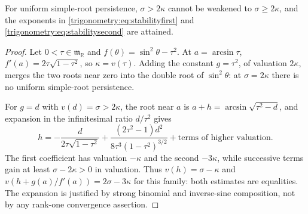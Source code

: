 \documentclass[11pt,letterpaper]{article}
\numberwithin{equation}{section}
\theoremstyle{definition}
\theoremstyle{remark}
\newcommand{\R}{\mathbb R}
\newcommand{\mm}{\mathfrak m}
\begin{document}
\begin{proposition}\label{trigonometry:prop:sharp}
For uniform simple-root persistence, $\sigma>2\kappa$ cannot be weakened to $\sigma\ge2\kappa$, and
the exponents in \cref{trigonometry:eq:stabilityfirst} and
\cref{trigonometry:eq:stabilitysecond} are attained.
\end{proposition}
\begin{proof}
Let $0<\tau\in\mm_{\R}$ and $f(\theta)=\sin^2\theta-\tau^2$. At $a=\arcsin\tau$,
$f'(a)=2\tau\sqrt{1-\tau^2}$, so $\kappa=v(\tau)$. Adding the constant $g=\tau^2$, of valuation
$2\kappa$, merges the two roots near zero into the double root of $\sin^2\theta$: at
$\sigma=2\kappa$ there is no uniform simple-root persistence.

For $g=d$ with $v(d)=\sigma>2\kappa$, the root near $a$ is $a+h=\arcsin\sqrt{\tau^2-d}$, and
expansion in the infinitesimal ratio $d/\tau^2$ gives
\[
 h=-\frac d{2\tau\sqrt{1-\tau^2}}
 +\frac{(2\tau^2-1)d^2}{8\tau^3(1-\tau^2)^{3/2}}+\text{terms of higher valuation}.
\]
The first coefficient has valuation $-\kappa$ and the second $-3\kappa$, while successive terms
gain at least $\sigma-2\kappa>0$ in valuation. Thus $v(h)=\sigma-\kappa$ and
$v(h+g(a)/f'(a))=2\sigma-3\kappa$ for this family: both estimates are equalities. The expansion is
justified by strong binomial and inverse-sine composition, not by any rank-one convergence
assertion.
\end{proof}
\end{document}

